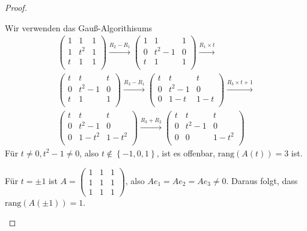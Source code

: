 \begin{proof}
	\begin{parts}
	\item Wir verwenden das Gauß-Algorithisums
		\begin{gather*}
			\left(
\begin{array}{ccc}
 1 & 1 & 1 \\
 1 & t^2 & 1 \\
 t & 1 & 1 \\
\end{array}
\right) \xrightarrow{R_2-R_1} \left(
\begin{array}{ccc}
 1 & 1 & 1 \\
 0 & t^2-1 & 0 \\
 t & 1 & 1 \\
\end{array}
\right) \xrightarrow{R_1\times t} \\\left(
\begin{array}{ccc}
 t & t & t \\
 0 & t^2-1 & 0 \\
 t & 1 & 1 \\
\end{array}
\right) \xrightarrow{R_3-R_1} \left(
\begin{array}{ccc}
 t & t & t \\
 0 & t^2-1 & 0 \\
 0 & 1-t & 1-t \\
\end{array}
\right) \xrightarrow{R_3\times t+1} \\\left(
\begin{array}{ccc}
 t & t & t \\
 0 & t^2-1 & 0 \\
 0 & 1-t^2 & 1-t^2 \\
\end{array}
\right) \xrightarrow{R_3+R_2} \left(
\begin{array}{ccc}
 t & t & t \\
 0 & t^2-1 & 0 \\
 0 & 0 & 1-t^2 \\
\end{array}
\right)
		\end{gather*}
F\"{u}r $t\neq 0, t^2-1\neq 0$, also $t\not\in \left\{ -1,0, 1\right\} $, ist es offenbar, $\text{rang}(A(t))=3$ ist.

F\"{u}r $t=\pm 1$ ist $A=\begin{pmatrix} 1 & 1 & 1 \\ 1 & 1 & 1 \\ 1 & 1 & 1 \end{pmatrix} $, also $Ae_1=Ae_2=Ae_3\neq 0$. Daraus folgt, dass $\text{rang}(A(\pm 1))=1$.


\end{parts}
\end{proof}
